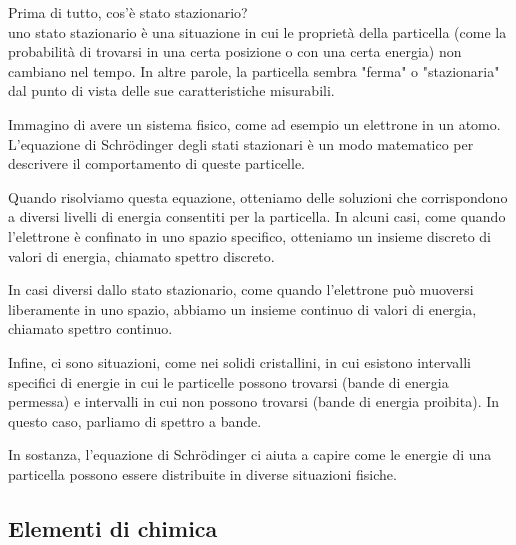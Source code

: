 \begin{exbox}
    Prima di tutto, cos'è stato stazionario?\\
    uno stato stazionario è una situazione in cui le proprietà della particella (come la probabilità di trovarsi in una certa posizione o con una certa energia) non cambiano nel tempo. In altre parole, la particella sembra "ferma" o "stazionaria" dal punto di vista delle sue caratteristiche misurabili.

    Immagino di avere un sistema fisico, come ad esempio un elettrone in un atomo.\\
    L'equazione di Schrödinger degli stati stazionari è un modo matematico per descrivere il comportamento di queste particelle.

    Quando risolviamo questa equazione, otteniamo delle soluzioni che corrispondono a diversi livelli di energia consentiti per la particella. In alcuni casi, come quando l'elettrone è confinato in uno spazio specifico, otteniamo un insieme discreto di valori di energia, chiamato spettro discreto.
    
    In casi diversi dallo stato stazionario, come quando l'elettrone può muoversi liberamente in uno spazio, abbiamo un insieme continuo di valori di energia, chiamato spettro continuo.

Infine, ci sono situazioni, come nei solidi cristallini, in cui esistono intervalli specifici di energie in cui le particelle possono trovarsi (bande di energia permessa) e intervalli in cui non possono trovarsi (bande di energia proibita). In questo caso, parliamo di spettro a bande.

In sostanza, l'equazione di Schrödinger ci aiuta a capire come le energie di una particella possono essere distribuite in diverse situazioni fisiche.
\end{exbox}
%
\cleardoublepage
\subsection{Elementi di chimica}
%
